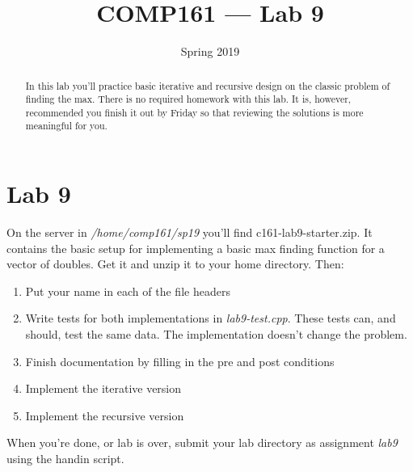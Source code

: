 \documentclass[nobib]{tufte-handout}
\title{COMP161 --- Lab 9}
\author{}
\date{Spring 2019}
\begin{document}
\maketitle

\begin{abstract}
In this lab you'll practice basic iterative and recursive design on the classic problem of finding the max. There is no required homework with this lab. It is, however, recommended you finish it out by Friday so that reviewing the solutions is more meaningful for you.
\end{abstract}

\section{Lab 9}

On the server in \textit{/home/comp161/sp19} you'll find c161-lab9-starter.zip. It contains the basic setup for implementing a basic max finding function for a vector of doubles. Get it and unzip it to your home directory. Then:
\begin{enumerate}
\item Put your name in each of the file headers
\item Write tests for both implementations in \textit{lab9-test.cpp}.  These tests can, and should, test the same data. The implementation doesn't change the problem.
\item Finish documentation by filling in the pre and post conditions
\item Implement the iterative version
\item Implement the recursive version
\end{enumerate}

When you're done, or lab is over, submit your lab directory as assignment \textit{lab9} using the handin script.
\end{document}
